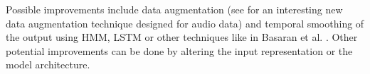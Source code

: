 \documentclass{article}
\begin{document}
Possible improvements include data augmentation (see \cite{Park_2019} for an interesting new data augmentation technique designed for audio data) and temporal smoothing of the output using HMM, LSTM or other techniques like in Basaran et al. \cite{DBasaranSEssid2018}. Other potential improvements can be done by altering the input representation or the model architecture. 



\end{document}

